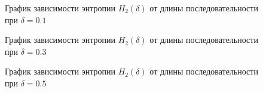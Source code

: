 ﻿\documentclass[a4paper,12pt]{article}
\theoremstyle{plain}
\begin{document}
\vspace*{1cm}
	\begin{figure}[h]
		\caption{График зависимости энтропии $H_2{(\delta)}$ от длины последовательности при  $\delta = 0.1$}
		\label{ris:"h2_01.png"}
	\end{figure}
	\begin{figure}[h]
		\caption{График зависимости энтропии $H_2{(\delta)}$ от длины последовательности при  $\delta = 0.3$}
		\label{ris:"h2_03.png"}
	\end{figure}
		\begin{figure}[h]
			\caption{График зависимости энтропии $H_2{(\delta)}$ от длины последовательности при  $\delta = 0.5$}
			\label{ris:"h2_05.png"}
		\end{figure}
\end{document}

